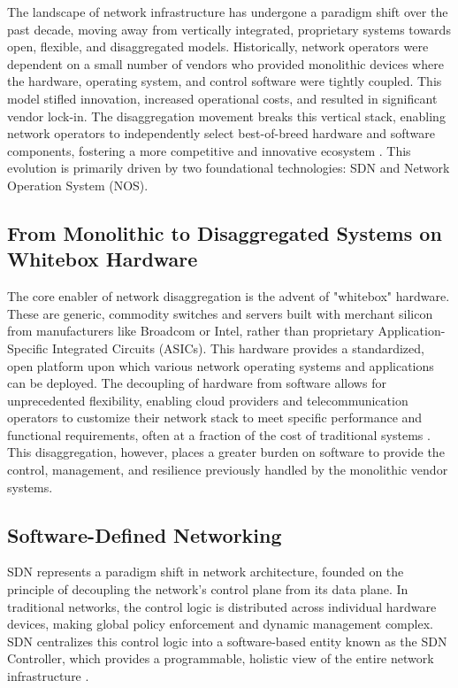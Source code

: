 \documentclass[12pt, a4paper, reqno, oneside]{book}
\begin{document}
The landscape of network infrastructure has undergone a paradigm shift over the past decade, moving away from vertically integrated, proprietary systems towards open, flexible, and disaggregated models. Historically, network operators were dependent on a small number of vendors who provided monolithic devices where the hardware, operating system, and control software were tightly coupled. This model stifled innovation, increased operational costs, and resulted in significant vendor lock-in. The disaggregation movement breaks this vertical stack, enabling network operators to independently select best-of-breed hardware and software components, fostering a more competitive and innovative ecosystem \cite{feamster2014case}. This evolution is primarily driven by two foundational technologies: SDN and Network Operation System (NOS).

\subsection{From Monolithic to Disaggregated Systems on Whitebox Hardware}

The core enabler of network disaggregation is the advent of "whitebox" hardware. These are generic, commodity switches and servers built with merchant silicon from manufacturers like Broadcom or Intel, rather than proprietary Application-Specific Integrated Circuits (ASICs). This hardware provides a standardized, open platform upon which various network operating systems and applications can be deployed. The decoupling of hardware from software allows for unprecedented flexibility, enabling cloud providers and telecommunication operators to customize their network stack to meet specific performance and functional requirements, often at a fraction of the cost of traditional systems \cite{Benson2010}. This disaggregation, however, places a greater burden on software to provide the control, management, and resilience previously handled by the monolithic vendor systems.

\subsection{Software-Defined Networking}
\label{sec:sdn}

SDN represents a paradigm shift in network architecture, founded on the principle of decoupling the network's control plane from its data plane. In traditional networks, the control logic is distributed across individual hardware devices, making global policy enforcement and dynamic management complex. SDN centralizes this control logic into a software-based entity known as the SDN Controller, which provides a programmable, holistic view of the entire network infrastructure \cite{paliwal2018controllers}.
\end{document}
